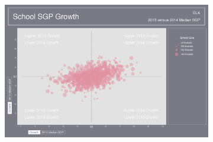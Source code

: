 \documentclass[12pt]{article}
\begin{document}
\begin{figure}[H]
\caption*{\label{fig:Bidensity} {\bf{Fig. C.3:}} Median SGP by Year and Content Area Bubble Plots for Grade-Level SAGE.}
  \begin{subfigure}[b]{\textwidth}
    \includegraphics[width=\textwidth]{../img/Appendices/Appendix_C/Bubble_Plots/School_2013_2014_ELA_Growth.png}
  \end{subfigure}
\end{figure}

\pagebreak
\end{document}
